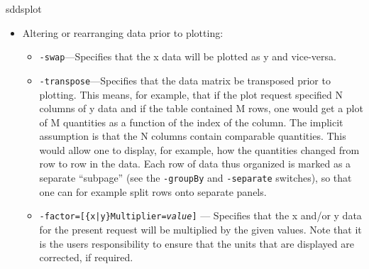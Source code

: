 \begin{sddsprog}{sddsplot}
\begin{itemize}
\begin{itemize}
The coordinates of the string may be specified either in users coordinates (i.e., x and y), or unit coordinates (i.e., p and
q); the unit coordinates are (0,0) at the lower left of the plot region and (1,1) at the upper right.  {\tt scale} permits
changing the size of the letters by a specified factor. {\tt angle} permits changing the angle of the string; a value of 90
gives upward vertical print.  

Normally, text is ``left bottom'' justified, which means that the coordinates given are those of the left bottom corner of
the first letter of the string.  Justification may be changed with the {\tt justifyMode} qualifier, which accepts a mode string
of the form {\tt \{ l | r | c\}\{t | b | c\}}.  The letters stand for Left, Right, Center, Top, and Bottom, respectively.
The default justification would thus be specified as {\tt justify=lb}.

The text is normally creating using line type 0.  This may be changed with the {\tt linetype} option.  As with the other
labels, the text may be edited using Toolkit editing commands (\hyperref[SDDSediting]{SDDS Editing}).

  \item {\tt -dateStamp}---Directs that a time and date stamp be placed on the plot.  It appears in the upper left corner
of the plot.

  \end{itemize}
\item Altering or rearranging data prior to plotting:
  \begin{itemize}

  \item {\tt -swap}---Specifies that the x data will be plotted as y and vice-versa.  

  \item {\tt -transpose}---Specifies that the data matrix be transposed prior to plotting.  This
means, for example, that if the plot request specified N columns of y data and if the table contained
M rows, one would get a plot of M quantities as a function of the index of the column.  The implicit
assumption is that the N columns contain comparable quantities.  This would allow one to display, for
example, how the quantities changed from row to row in the data.  Each row of data thus organized is
marked as a separate ``subpage'' (see the {\tt -groupBy} and {\tt -separate} switches), so that one
can for example split rows onto separate panels.

  \item {\tt -factor=[\{x|y\}Multiplier={\em value}]} --- Specifies that the x
and/or y data for the present request will be multiplied by the given values.  Note that it is the
users responsibility to ensure that the units that are displayed are corrected, if required.


\end{itemize}
\end{itemize}
\end{sddsprog}
